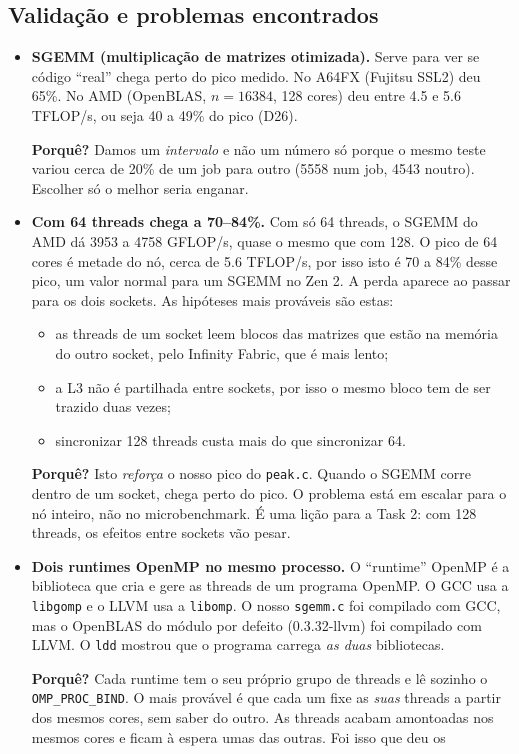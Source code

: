 \documentclass[11pt,a4paper]{article}
\newcommand{\porque}[1]{\par\noindent\colorbox{blue!6}{\parbox{\dimexpr\linewidth-2\fboxsep}{\small\textbf{Porquê?} #1}}\par}
\begin{document}
\subsection{Validação e problemas encontrados}
\begin{itemize}
\item \textbf{SGEMM (multiplicação de matrizes otimizada).} Serve para ver se código ``real'' chega perto
do pico medido. No A64FX (Fujitsu SSL2) deu 65\%. No AMD (OpenBLAS, $n=16384$, 128 cores) deu entre
4.5 e 5.6 TFLOP/s, ou seja 40 a 49\% do pico (D26).
\porque{Damos um \emph{intervalo} e não um número só porque o mesmo teste variou cerca de 20\% de um job
para outro (5558 num job, 4543 noutro). Escolher só o melhor seria enganar.}
\item \textbf{Com 64 threads chega a 70--84\%.} Com só 64 threads, o SGEMM do AMD dá 3953 a 4758
GFLOP/s, quase o mesmo que com 128. O pico de 64 cores é metade do nó, cerca de 5.6 TFLOP/s, por isso
isto é 70 a 84\% desse pico, um valor normal para um SGEMM no Zen 2. A perda aparece ao passar para os
dois sockets. As hipóteses mais prováveis são estas:
\begin{itemize}
\item as threads de um socket leem blocos das matrizes que estão na memória do outro socket, pelo
Infinity Fabric, que é mais lento;
\item a L3 não é partilhada entre sockets, por isso o mesmo bloco tem de ser trazido duas vezes;
\item sincronizar 128 threads custa mais do que sincronizar 64.
\end{itemize}
\porque{Isto \emph{reforça} o nosso pico do \texttt{peak.c}. Quando o SGEMM corre dentro de um socket,
chega perto do pico. O problema está em escalar para o nó inteiro, não no microbenchmark. É uma lição
para a Task 2: com 128 threads, os efeitos entre sockets vão pesar.}
\item \textbf{Dois runtimes OpenMP no mesmo processo.} O ``runtime'' OpenMP é a biblioteca que cria e
gere as threads de um programa OpenMP. O GCC usa a \texttt{libgomp} e o LLVM usa a \texttt{libomp}. O
nosso \texttt{sgemm.c} foi compilado com GCC, mas o OpenBLAS do módulo por defeito
(0.3.32-llvm) foi compilado com LLVM. O \texttt{ldd} mostrou que o programa carrega \emph{as duas}
bibliotecas.
\porque{Cada runtime tem o seu próprio grupo de threads e lê sozinho o \texttt{OMP\_PROC\_BIND}. O mais
provável é que cada um fixe as \emph{suas} threads a partir dos mesmos cores, sem saber do outro. As
threads acabam amontoadas nos mesmos cores e ficam à espera umas das outras. Foi isso que deu os
}
\end{itemize}
\end{document}
